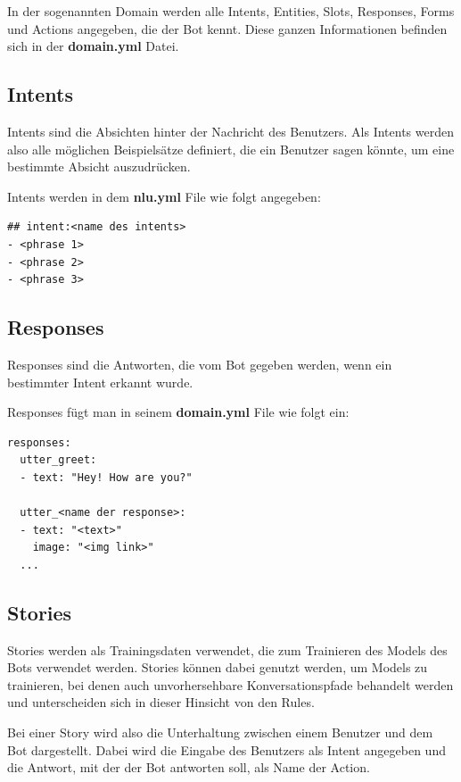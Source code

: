 In der sogenannten Domain werden alle Intents, Entities, Slots, Responses, Forms und Actions angegeben, die der Bot kennt.
Diese ganzen Informationen befinden sich in der \textbf{domain.yml} Datei.\cite{domain}

\subsection{Intents}

Intents sind die Absichten hinter der Nachricht des Benutzers.
Als Intents werden also alle möglichen Beispielsätze definiert, die ein Benutzer sagen könnte, um eine bestimmte Absicht auszudrücken.\cite{intents}

Intents werden in dem \textbf{nlu.yml} File wie folgt angegeben:

\begin{lstlisting}[label={lst: Intent Example}]
## intent:<name des intents>
- <phrase 1>
- <phrase 2>
- <phrase 3>
\end{lstlisting}

\subsection{Responses}

Responses sind die Antworten, die vom Bot gegeben werden, wenn ein bestimmter Intent erkannt wurde.\cite{responses}

Responses fügt man in seinem \textbf{domain.yml} File wie folgt ein:

\begin{lstlisting}[label={lst: Responses Example}]
responses:
  utter_greet:
  - text: "Hey! How are you?"

  utter_<name der response>:
  - text: "<text>"
    image: "<img link>"
  ...
\end{lstlisting}


\subsection{Stories}

Stories werden als Trainingsdaten verwendet, die zum Trainieren des Models des Bots verwendet werden.
Stories können dabei genutzt werden, um Models zu trainieren, bei denen auch unvorhersehbare Konversationspfade behandelt werden und unterscheiden sich in dieser Hinsicht von den Rules.
\cite{stories}

Bei einer Story wird also die Unterhaltung zwischen einem Benutzer und dem Bot dargestellt.
Dabei wird die Eingabe des Benutzers als Intent angegeben und die Antwort, mit der der Bot antworten soll, als Name der Action.
\cite{stories}

